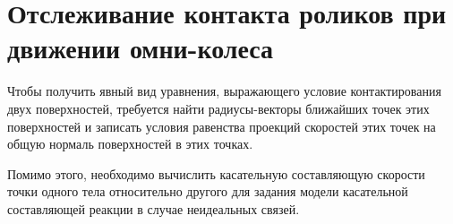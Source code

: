 \section{Отслеживание контакта роликов при движении омни-колеса}\label{sect:track_omni}


Чтобы получить явный вид уравнения, выражающего условие контактирования двух поверхностей, требуется найти радиусы-векто\-ры ближайших точек этих поверхностей и записать условия равенства проекций скоростей этих точек на общую нормаль поверхностей в этих точках.

Помимо этого, необходимо вычислить касательную составляющую скорости точки одного тела относительно другого для задания модели касательной составляющей реакции в случае неидеальных связей.







